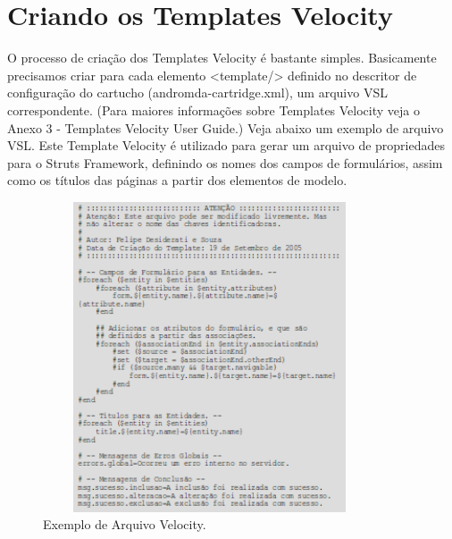\begin{enumerate}
\begin{itemize}
	\end{itemize}

\section{Criando os Templates Velocity}
O processo de criação dos Templates Velocity é bastante simples. Basicamente
precisamos criar para cada elemento <template/> definido no descritor de
configuração do cartucho (andromda-cartridge.xml), um arquivo VSL
correspondente. (Para maiores informações sobre Templates Velocity veja o Anexo
3 - Templates Velocity User Guide.) Veja abaixo um exemplo de arquivo VSL. Este
Template Velocity é utilizado para gerar um arquivo de propriedades para o
Struts Framework, definindo os nomes dos campos de formulários, assim como os
títulos das páginas a partir dos elementos de modelo.

\begin{figure}[H]
	\centering
	\includegraphics[width=280pt,height=260pt]{files/imgs/apendice-cartucho-novo-00005.png}
	\caption{Exemplo de Arquivo Velocity.}
	\label{exemplo_velocity}
\end{figure}

\end{enumerate}